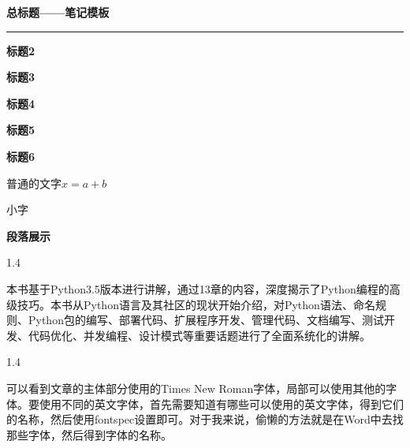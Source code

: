 \documentclass{article} %
\newcommand{\TP}[1]{\begin{spacing}{1.4}\par{#1}\end{spacing}}%
\newcommand{\TL}[1]{\begin{flushleft}#1\end{flushleft}}%
\newcommand{\x}[1]{\TL{\fontsize{28pt}{0}\textbf{\kai#1}\\[1.5em] \hrule}}%
\newcommand{\xx}[1]{\TL{\fontsize{24pt}{0}\textbf{\yh#1}\\[1.3em]}}
\newcommand{\xxx}[1]{\TL{\fontsize{20pt}{0}\textbf{\yh#1}\\[1.25em]}}
\newcommand{\xxxx}[1]{\TL{\fontsize{16pt}{0}\textbf{\yh#1}\\[1.25em]}}
\newcommand{\xxxxx}[1]{\TL{\fontsize{12pt}{0}\textbf{\yh#1}\\[1.25em]}}
\newcommand{\xxxxxx}[1]{\TL{\fontsize{10pt}{0}\textbf{\yh#1}\\[1.25em]}}
\newcommand{\xs}[1]{\TL{\fontsize{8.5pt}{0}#1\\[1.5em]}}%
\begin{document}
	\x{总标题——笔记模板}
	\xx{标题2}
	\xxx{标题3}
	\xxxx{标题4}
	\xxxxx{标题5}
	\xxxxxx{标题6}
	普通的文字$x=a+b$
	\xs{小字}
	\xxx{段落展示}
	\TP{本书基于Python3.5版本进行讲解，通过13章的内容，深度揭示了Python编程的高级技巧。本书从Python语言及其社区的现状开始介绍，对Python语法、命名规则、Python包的编写、部署代码、扩展程序开发、管理代码、文档编写、测试开发、代码优化、并发编程、设计模式等重要话题进行了全面系统化的讲解。}
	\TP{可以看到文章的主体部分使用的Times New Roman字体，局部可以使用其他的字体。要使用不同的英文字体，首先需要知道有哪些可以使用的英文字体，得到它们的名称，然后使用fontspec设置即可。对于我来说，偷懒的方法就是在Word中去找那些字体，然后得到字体的名称。}
	
\end{document}
